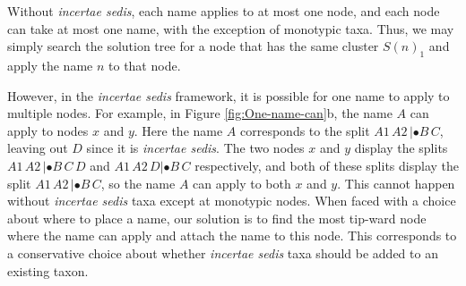 \documentclass[english]{article}
\begin{document}
Without \emph{incertae sedis}, each name applies to at most one node, and each
node can take at most one name, with the exception of monotypic taxa. Thus, we
may simply search the solution tree for a node that has the same cluster $S(n)_{1}$
and apply the name $n$ to that node.

However, in the \emph{incertae sedis} framework, it is possible for one name to
apply to multiple nodes. For example, in Figure \ref{fig:One-name-can}b, the
name $A$ can apply to nodes $x$ and $y$. Here the name $A$ corresponds to the split
$A1\,A2\,|\bullet B\,C$, leaving out $D$ since it is \emph{incertae sedis}. The two nodes $x$
and $y$ display the splits $A1\,A2\,|\bullet B\,C\,D$ and $A1\,A2\,D|\bullet
B\,C$ respectively, and both
of these splits display the split $A1\,A2\,|\bullet B\,C$, so the name $A$ can apply to both
$x$ and $y$. This cannot happen without\emph{ incertae sedis} taxa except at
monotypic nodes. When faced with a choice about where to place a name, our
solution is to find the most tip-ward node where the name can apply and attach
the name to this node. This corresponds to a conservative choice about whether
\emph{incertae sedis} taxa should be added to an existing taxon.
\end{document}
